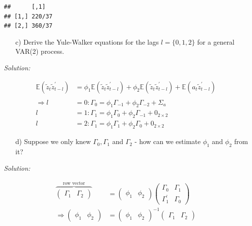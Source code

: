 \documentclass[12pt,a4paper]{article}
\begin{document}
\begin{verbatim}
##      [,1]  
## [1,] 220/37
## [2,] 360/37
\end{verbatim}

\begin{itemize}
    \item[c)] Derive the Yule-Walker equations for the lags $l = \{0,1,2 \}$ for a general VAR(2) process.
\end{itemize}

\emph{Solution:}

\begin{align*}
  \mathbb{E} \left( \tilde{z}_{t} \tilde{z}_{t-l}^{'} \right) & =  \phi_1 \mathbb{E} \left( \tilde{z}_{t} \tilde{z}_{t-l}^{'} \right) + \phi_2 \mathbb{E} \left( \tilde{z}_{t} \tilde{z}_{t-l}^{'} \right) + \mathbb{E} \left( a_{t} \tilde{z}_{t-l}^{'} \right)\\
  \\
  \Rightarrow l & = 0: \Gamma_0 = \phi_1 \Gamma_{-1} + \phi_2 \Gamma_{-2} + \Sigma_a \\
  l & = 1: \Gamma_1 = \phi_1 \Gamma_{0} + \phi_2 \Gamma_{-1} + 0_{2 \times 2}\\
  l & = 2: \Gamma_1 = \phi_1 \Gamma_{1} + \phi_2 \Gamma_{0} + 0_{2 \times 2}
\end{align*}

\begin{itemize}
    \item[d)] Suppose we only knew $\Gamma_0 , \Gamma_1$ and $\Gamma_2$ - how can we estimate $\phi_1$ and $\phi_2$ from it?
\end{itemize}

\emph{Solution:}

\begin{align*}
  \overbrace{\begin{pmatrix} \Gamma_1 & \Gamma_2 \end{pmatrix}}^{\text{row vector}} & = \begin{pmatrix} \phi_1 & \phi_2 \end{pmatrix} \begin{pmatrix} \Gamma_0 & \Gamma_1\\
  \Gamma_1^{'} & \Gamma_0 \end{pmatrix}\\
  \Rightarrow \begin{pmatrix} \phi_1 & \phi_2 \end{pmatrix} & = \begin{pmatrix} \phi_1 & \phi_2 \end{pmatrix}^{-1} \begin{pmatrix} \Gamma_1 & \Gamma_2 \end{pmatrix} 
\end{align*}
\end{document}
